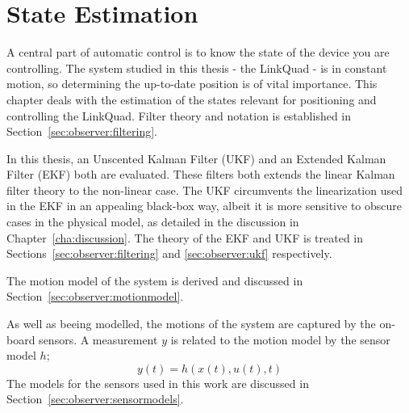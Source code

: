 \chapter{State Estimation}
\label{cha:observer}
    A central part of automatic control is to know the state of the device you are
    controlling. The system studied in this thesis - the LinkQuad - is in constant
    motion, so determining the up-to-date position is of vital importance.
    This chapter deals with the estimation of the states relevant for positioning
    and controlling the LinkQuad.
    Filter theory and notation is established in Section~\ref{sec:observer:filtering}.

    In this thesis, an Unscented Kalman Filter (UKF) and an Extended Kalman Filter (EKF) both are evaluated.
    These filters both extends the linear Kalman filter theory to the non-linear case.
    The UKF circumvents the linearization used in the EKF in an appealing black-box way,
    albeit it is more sensitive to obscure cases in the physical model,
    as detailed in the discussion in Chapter~\ref{cha:discussion}.
    The theory of the EKF and UKF is treated in
    Sections~\ref{sec:observer:filtering} and \ref{sec:observer:ukf} respectively.

    The motion model of the system is derived and discussed in Section~\ref{sec:observer:motionmodel}.

    As well as beeing modelled, the motions of the system are captured by the on-board sensors.
    A measurement $y$ is related to the motion model by the sensor model $h$;
    \begin{equation}
        y(t) = h(x(t),u(t),t)
    \end{equation}
    The models for the sensors used in this work are discussed in Section~\ref{sec:observer:sensormodels}.

    
    
    
    
